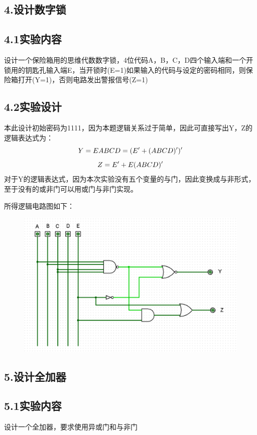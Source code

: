 \documentclass{ctexart}
\begin{document}
    \subsection*{4.设计数字锁}
    \subsection*{4.1实验内容}
    设计一个保险箱用的思维代数数字锁，4位代码A，B，C，D四个输入端和一个开锁用的钥匙孔输入端E，当开锁时(E=1)如果输入的代码与设定的密码相同，则保险箱打开(Y=1)，否则电路发出警报信号(Z=1)
    \subsection*{4.2实验设计}
    本此设计初始密码为1111，因为本题逻辑关系过于简单，因此可直接写出Y，Z的逻辑表达式为：
    \begin{equation}
        Y=EABCD=(E'+(ABCD)')'\notag 
    \end{equation}
    \begin{equation}
        Z=E'+E(ABCD)'\notag
    \end{equation}
    对于Y的逻辑表达式，因为本次实验没有五个变量的与门，因此变换成与非形式，至于没有的或非门可以用或门与非门实现。

    所得逻辑电路图如下：
    \begin{figure}[htbp]
        \centering
        \includegraphics[width=16cm]{3.4.1.png}
    \end{figure}

    \newpage
    \subsection*{5.设计全加器}
    \subsection*{5.1实验内容}
    设计一个全加器，要求使用异或门和与非门
\end{document}
